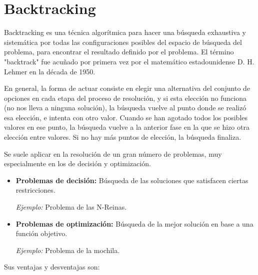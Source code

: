 \documentclass[a4paper,12pt]{article}
\begin{document}


\newpage
\section{Backtracking}
Backtracking es una técnica algorítmica para hacer una búsqueda exhaustiva y sistemática por todas las configuraciones posibles del espacio de búsqueda del problema, para encontrar el resultado definido por el problema.
El término "backtrack" fue acuñado por primera vez por el matemático estadounidense D. H. Lehmer en la década de 1950.

En general, la forma de actuar consiste en elegir una alternativa del conjunto de opciones en cada etapa del proceso de resolución, y si esta elección no funciona (no nos lleva a ninguna solución), la búsqueda vuelve al punto donde se realizó esa elección, e intenta con otro valor. Cuando se han agotado todos los posibles valores en ese punto, la búsqueda vuelve a la anterior fase en la que se hizo otra elección entre valores. Si no hay más puntos de elección, la búsqueda finaliza.

Se suele aplicar en la resolución de un gran número de problemas, muy especialmente en los de decisión y optimización.
\begin{itemize}
    \item \textbf{Problemas de decisión:} Búsqueda de las soluciones que satisfacen ciertas restricciones.
    
    \textit{Ejemplo:} Problema de las N-Reinas.

    \item \textbf{Problemas de optimización:} Búsqueda de la mejor solución en base a una función objetivo.

    \textit{Ejemplo:} Problema de la mochila.
\end{itemize}

Sus ventajas y desventajas son:
\end{document}

